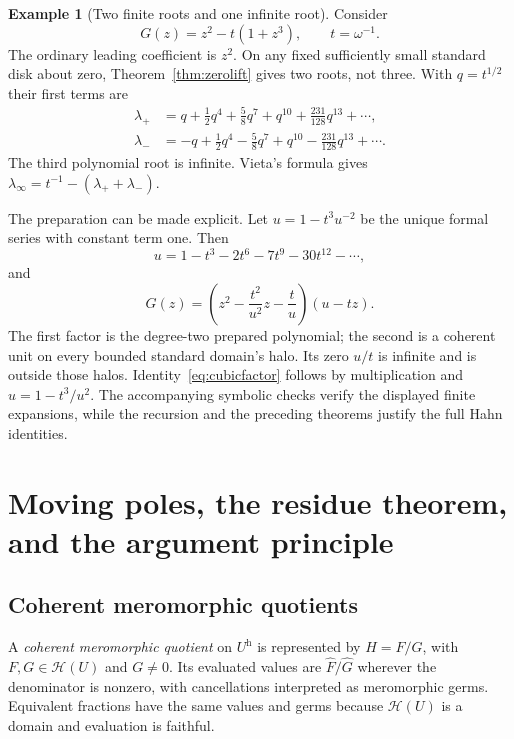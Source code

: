 \documentclass[11pt,a4paper]{article}
\theoremstyle{definition}\newtheorem{definition}[theorem]{Definition}
\newtheorem{example}[theorem]{Example}
\theoremstyle{remark}\newtheorem{remark}[theorem]{Remark}
\newcommand{\A}{\mathscr H}\newcommand{\hol}{\mathcal O}
\newcommand{\ev}[1]{\widehat{#1}}
\newcommand{\halo}[1]{#1^{\mathrm h}}
\numberwithin{equation}{section}
\begin{document}
\begin{example}[Two finite roots and one infinite root]\label{ex:cubic}
Consider
\[
 G(z)=z^2-t(1+z^3),\qquad t=\omega^{-1}.
\]
The ordinary leading coefficient is $z^2$. On any fixed sufficiently small standard disk about zero, Theorem~\ref{thm:zerolift} gives two roots, not three. With $q=t^{1/2}$ their first terms are
\begin{align*}
 \lambda_+&=q+\tfrac12q^4+\tfrac58q^7+q^{10}
                   +\tfrac{231}{128}q^{13}+\cdots,\\
 \lambda_-&=-q+\tfrac12q^4-\tfrac58q^7+q^{10}
                   -\tfrac{231}{128}q^{13}+\cdots.
\end{align*}
The third polynomial root is infinite. Vieta's formula gives
$\lambda_\infty=t^{-1}-(\lambda_++\lambda_-)$.

The preparation can be made explicit. Let $u=1-t^3u^{-2}$ be the unique formal series with constant term one. Then
\[
 u=1-t^3-2t^6-7t^9-30t^{12}-\cdots,
\]
and
\begin{equation}\label{eq:cubicfactor}
 G(z)=
 \left(z^2-\frac{t^2}{u^2}z-\frac tu\right)(u-tz).
\end{equation}
The first factor is the degree-two prepared polynomial; the second is a coherent unit on every bounded standard domain's halo. Its zero $u/t$ is infinite and is outside those halos. Identity~\eqref{eq:cubicfactor} follows by multiplication and $u=1-t^3/u^2$. The accompanying symbolic checks verify the displayed finite expansions, while the recursion and the preceding theorems justify the full Hahn identities.
\end{example}

\section{Moving poles, the residue theorem, and the argument principle}\label{sec:residuetheorem}

\subsection{Coherent meromorphic quotients}
A \emph{coherent meromorphic quotient} on $\halo U$ is represented by $H=F/G$, with $F,G\in\A(U)$ and $G\ne0$. Its evaluated values are $\ev F/\ev G$ wherever the denominator is nonzero, with cancellations interpreted as meromorphic germs. Equivalent fractions have the same values and germs because $\A(U)$ is a domain and evaluation is faithful.
\end{document}
